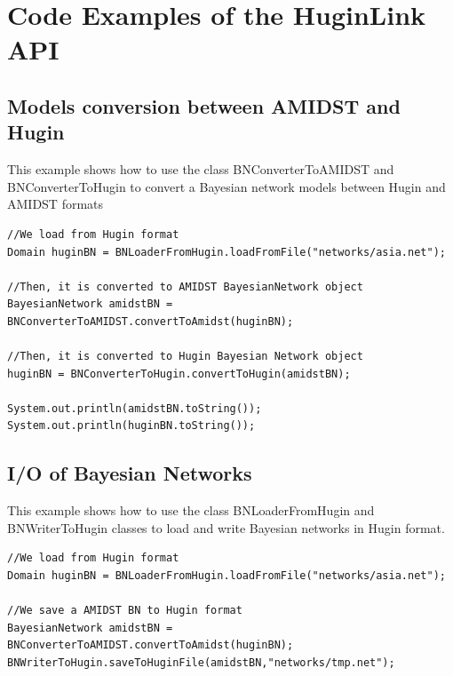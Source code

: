 \chapter{Code Examples of the HuginLink API}\label{sec:codeExamples}

\section{Models conversion between AMIDST and Hugin}

This example shows how to use the class BNConverterToAMIDST and BNConverterToHugin to convert a 
Bayesian network models between Hugin and AMIDST formats


\begin{lstlisting}
//We load from Hugin format
Domain huginBN = BNLoaderFromHugin.loadFromFile("networks/asia.net");

//Then, it is converted to AMIDST BayesianNetwork object
BayesianNetwork amidstBN = BNConverterToAMIDST.convertToAmidst(huginBN);

//Then, it is converted to Hugin Bayesian Network object
huginBN = BNConverterToHugin.convertToHugin(amidstBN);

System.out.println(amidstBN.toString());
System.out.println(huginBN.toString());
\end{lstlisting}



\section{I/O of Bayesian Networks}

This example shows how to use the class BNLoaderFromHugin and BNWriterToHugin classes to load and
write Bayesian networks in Hugin format.

\begin{lstlisting}
//We load from Hugin format
Domain huginBN = BNLoaderFromHugin.loadFromFile("networks/asia.net");

//We save a AMIDST BN to Hugin format
BayesianNetwork amidstBN = BNConverterToAMIDST.convertToAmidst(huginBN);
BNWriterToHugin.saveToHuginFile(amidstBN,"networks/tmp.net");
\end{lstlisting}

